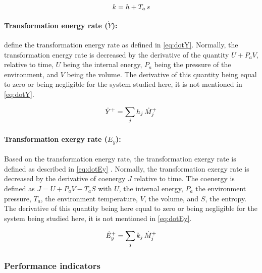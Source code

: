 \begin{equation}
  \label{eq:k}
  k = h + T_a\,s
  \tagaddtextone{$\left[\si{\joule\per\kilo\gram}\right]$}
\end{equation}

\paragraph{Transformation energy rate ($\dot{Y}$):}

\citet[p.\,24]{Borel-Favrat-2010a} define the transformation energy
rate as defined in \cref{eq:dotY}. Normally, the transformation energy
rate is decreased by the derivative of the quantity $U + P_aV$,
relative to time, $U$ being the internal energy, $P_a$ being the
pressure of the environment, and $V$ being the volume. The derivative
of this quantity being equal to zero or being negligible for the
system studied here, it is not mentioned in \cref{eq:dotY}.

\begin{equation}
  \label{eq:dotY}
  \dot{Y}^{+} = \sum_{j} h_j \, \dot{M}_j^{+}
  \tagaddtextone{$\left[\si{\watt}\right]$}
\end{equation}

\paragraph{Transformation exergy rate ($\dot{E}_{y}$):}

Based on the transformation energy rate, the transformation exergy
rate is defined as described in \cref{eq:dotEy}
\citep[p.\,410]{Borel-Favrat-2010a}. Normally, the transformation
exergy rate is decreased by the derivative of coenergy $J$ relative to
time. The coenergy is defined as $J = U + P_aV-T_aS$ with $U$, the
internal energy, $P_a$ the environment pressure, $T_a$, the
environment temperature, $V$, the volume, and $S$, the entropy. The
derivative of this quantity being here equal to zero or being
negligible for the system being studied here, it is not mentioned in
\cref{eq:dotEy}.

\begin{equation}
  \label{eq:dotEy}
  \dot{E}_{y}^{+} = \sum_{j} k_j \, \dot{M}_j^{+}
  \tagaddtextone{$\left[\si{\watt}\right]$}
\end{equation}

\subsubsection{Performance indicators}
\label{sec:methodo-indicators}

